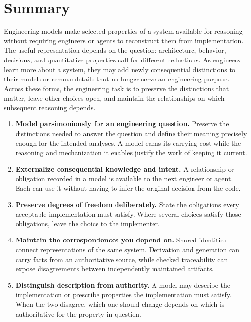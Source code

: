 


\chapter{Summary}

Engineering models make selected properties of a system available for reasoning without requiring engineers or agents to reconstruct them from implementation. The useful representation depends on the question: architecture, behavior, decisions, and quantitative properties call for different reductions. As engineers learn more about a system, they may add newly consequential distinctions to their models or remove details that no longer serve an engineering purpose. Across these forms, the engineering task is to preserve the distinctions that matter, leave other choices open, and maintain the relationships on which subsequent reasoning depends.

\begin{enumerate}
\def\labelenumi{\arabic{enumi}.}
\tightlist
\item
  \textbf{Model parsimoniously for an engineering question.} Preserve the distinctions needed to answer the question and define their meaning precisely enough for the intended analyses. A model earns its carrying cost while the reasoning and mechanization it enables justify the work of keeping it current.
\item
  \textbf{Externalize consequential knowledge and intent.} A relationship or obligation recorded in a model is available to the next engineer or agent. Each can use it without having to infer the original decision from the code.
\item
  \textbf{Preserve degrees of freedom deliberately.} State the obligations every acceptable implementation must satisfy. Where several choices satisfy those obligations, leave the choice to the implementer.
\item
  \textbf{Maintain the correspondences you depend on.} Shared identities connect representations of the same system. Derivation and generation can carry facts from an authoritative source, while checked traceability can expose disagreements between independently maintained artifacts.
\item
  \textbf{Distinguish description from authority.} A model may describe the implementation or prescribe properties the implementation must satisfy. When the two disagree, which one should change depends on which is authoritative for the property in question.
\end{enumerate}

